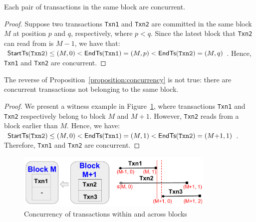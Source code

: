 \begin{proposition}
  \label{proposition:concurrency}  
  Each pair of transactions in the same block are concurrent. 
\end{proposition} 

\begin{proof}
  Suppose two transactions \texttt{Txn1} and \texttt{Txn2} are committed in the
  same block $M$ at position $p$ and $q$, respectively, where $p < q$.
  Since the latest block that \texttt{Txn2} can read from is $M{-}1$, we have
  that: $\textsf{StartTs}(\texttt{Txn2}) \le (M,0) < \textsf{EndTs}(\texttt{Txn1}) = (M,p) < \textsf{EndTs}(\texttt{Txn2}) =
  (M,q)$.
  Hence, \texttt{Txn1} and \texttt{Txn2} are concurrent.
\end{proof}

\begin{proposition}
  \label{proposition:nonconcurrency}  
  The reverse of Proposition~\ref{proposition:concurrency} is not true: there are concurrent transactions not belonging to the same block.
\end{proposition} 

\begin{proof}
  We present a witness example in Figure~\ref{diagram:txn:theory_concurrency}, where
  transactions \texttt{Txn1} and \texttt{Txn2} respectively belong to block $M$
  and $M{+}1$. However, \texttt{Txn2} reads from a block earlier than $M$.
  Hence, we have: $\textsf{StartTs}(\texttt{Txn2}) \le (M,0) < \textsf{EndTs}(\texttt{Txn1}) = (M,1) <
  \textsf{EndTs}(\texttt{Txn2}) = (M{+}1,1)$.
  Therefore, \texttt{Txn1} and \texttt{Txn2} are concurrent.
\end{proof}

\begin{figure}[tp] \centering
  \includegraphics[width=0.85\textwidth]{diagram/txn/theory_concurrency.pdf}
  \caption{Concurrency of transactions within and across blocks}
  \label{diagram:txn:theory_concurrency}
\end{figure}

